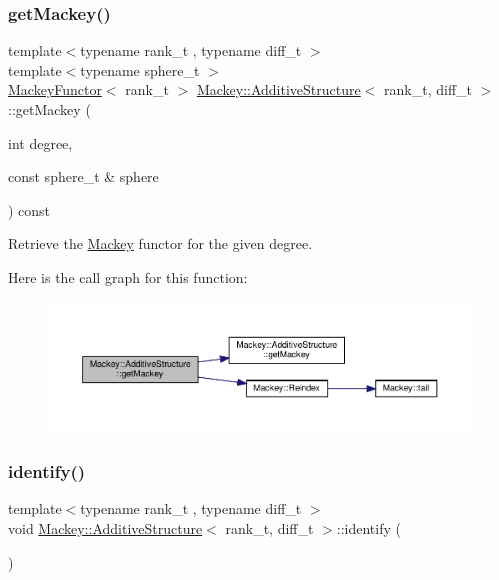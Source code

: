 \subsubsection{\texorpdfstring{get\+Mackey()}{getMackey()}\hspace{0.1cm}{\footnotesize\ttfamily [2/2]}}
{\footnotesize\ttfamily template$<$typename rank\+\_\+t , typename diff\+\_\+t $>$ \\
template$<$typename sphere\+\_\+t $>$ \\
\hyperlink{classMackey_1_1MackeyFunctor}{Mackey\+Functor}$<$ rank\+\_\+t $>$ \hyperlink{classMackey_1_1AdditiveStructure}{Mackey\+::\+Additive\+Structure}$<$ rank\+\_\+t, diff\+\_\+t $>$\+::get\+Mackey (\begin{DoxyParamCaption}\item[{int}]{degree,  }\item[{const sphere\+\_\+t \&}]{sphere }\end{DoxyParamCaption}) const}



Retrieve the \hyperlink{namespaceMackey}{Mackey} functor for the given degree. 

Here is the call graph for this function\+:\nopagebreak
\begin{figure}[H]
\begin{center}
\leavevmode
\includegraphics[width=350pt]{classMackey_1_1AdditiveStructure_a2638212adc9b1fdacf0a50d9fb23cf0d_cgraph}
\end{center}
\end{figure}
\mbox{\label{classMackey_1_1AdditiveStructure_a07887e78e182c1215fc7c8af3f385529}} 
\subsubsection{\texorpdfstring{identify()}{identify()}}
{\footnotesize\ttfamily template$<$typename rank\+\_\+t , typename diff\+\_\+t $>$ \\
void \hyperlink{classMackey_1_1AdditiveStructure}{Mackey\+::\+Additive\+Structure}$<$ rank\+\_\+t, diff\+\_\+t $>$\+::identify (\begin{DoxyParamCaption}{ }\end{DoxyParamCaption})}



